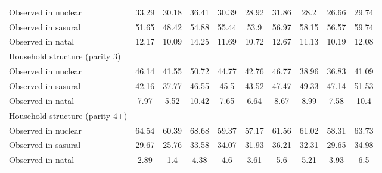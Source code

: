 \begin{tabular}{l*{9}{c}}
Observed in nuclear &       33.29&       30.18&       36.41&       30.39&       28.92&       31.86&        28.2&       26.66&       29.74\\
Observed in sasural &       51.65&       48.42&       54.88&       55.44&        53.9&       56.97&       58.15&       56.57&       59.74\\
Observed in natal   &       12.17&       10.09&       14.25&       11.69&       10.72&       12.67&       11.13&       10.19&       12.08\\
\midrule
Household structure (parity 3)&            &            &            &            &            &            &            &            &            \\
Observed in nuclear &       46.14&       41.55&       50.72&       44.77&       42.76&       46.77&       38.96&       36.83&       41.09\\
Observed in sasural &       42.16&       37.77&       46.55&        45.5&       43.52&       47.47&       49.33&       47.14&       51.53\\
Observed in natal   &        7.97&        5.52&       10.42&        7.65&        6.64&        8.67&        8.99&        7.58&        10.4\\
\midrule
Household structure (parity 4+)&            &            &            &            &            &            &            &            &            \\
Observed in nuclear &       64.54&       60.39&       68.68&       59.37&       57.17&       61.56&       61.02&       58.31&       63.73\\
Observed in sasural &       29.67&       25.76&       33.58&       34.07&       31.93&       36.21&       32.31&       29.65&       34.98\\
Observed in natal   &        2.89&         1.4&        4.38&         4.6&        3.61&         5.6&        5.21&        3.93&         6.5\\
\bottomrule
\end{tabular}
